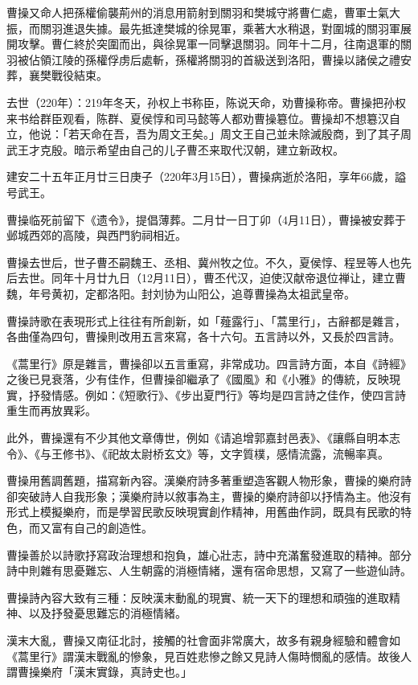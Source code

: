 曹操又命人把孫權偷襲荊州的消息用箭射到關羽和樊城守將曹仁處，曹軍士氣大振，而關羽進退失據。最先抵達樊城的徐晃軍，乘著大水稍退，對圍城的關羽軍展開攻擊。曹仁終於突圍而出，與徐晃軍一同擊退關羽。同年十二月，往南退軍的關羽被佔領江陵的孫權俘虏后處斬，孫權將關羽的首級送到洛阳，曹操以諸侯之禮安葬，襄樊戰役結束。

去世（220年）：219年冬天，孙权上书称臣，陈说天命，劝曹操称帝。曹操把孙权来书给群臣观看，陈群、夏侯惇和司马懿等人都劝曹操簒位。曹操却不想簒汉自立，他说：「若天命在吾，吾为周文王矣。」周文王自己並未除滅殷商，到了其子周武王才克殷。暗示希望由自己的儿子曹丕来取代汉朝，建立新政权。

建安二十五年正月廿三日庚子（220年3月15日），曹操病逝於洛阳，享年66歲，謚号武王。

曹操临死前留下《遗令》，提倡薄葬。二月廿一日丁卯（4月11日），曹操被安葬于邺城西郊的高陵，與西門豹祠相近。

曹操去世后，世子曹丕嗣魏王、丞相、冀州牧之位。不久，夏侯惇、程昱等人也先后去世。同年十月廿九日（12月11日），曹丕代汉，迫使汉献帝退位禅让，建立曹魏，年号黄初，定都洛阳。封刘协为山阳公，追尊曹操為太祖武皇帝。

曹操詩歌在表現形式上往往有所創新，如「薤露行」、「蒿里行」，古辭都是雜言，各曲僅為四句，曹操則改用五言來寫，各十六句。五言詩以外，又長於四言詩。

《蒿里行》原是雜言，曹操卻以五言重寫，非常成功。四言詩方面，本自《詩經》之後已見衰落，少有佳作，但曹操卻繼承了《國風》和《小雅》的傳統，反映現實，抒發情感。例如：《短歌行》、《步出夏門行》等均是四言詩之佳作，使四言詩重生而再放異彩。

此外，曹操還有不少其他文章傳世，例如《请追增郭嘉封邑表》、《讓縣自明本志令》、《与王修书》、《祀故太尉桥玄文》等，文字質樸，感情流露，流暢率真。

曹操用舊調舊題，描寫新內容。漢樂府詩多著重塑造客觀人物形象，曹操的樂府詩卻突破詩人自我形象；漢樂府詩以敘事為主，曹操的樂府詩卻以抒情為主。他沒有形式上模擬樂府，而是學習民歌反映現實創作精神，用舊曲作詞，既具有民歌的特色，而又富有自己的創造性。

曹操善於以詩歌抒寫政治理想和抱負，雄心壯志，詩中充滿奮發進取的精神。部分詩中則雜有思憂難忘、人生朝露的消極情緒，還有宿命思想，又寫了一些遊仙詩。

曹操詩內容大致有三種：反映漢末動亂的現實、統一天下的理想和頑強的進取精神、以及抒發憂思難忘的消極情緒。

漢末大亂，曹操又南征北討，接觸的社會面非常廣大，故多有親身經驗和體會如《蒿里行》謂漢末戰亂的慘象，見百姓悲慘之餘又見詩人傷時憫亂的感情。故後人謂曹操樂府「漢末實錄，真詩史也。」

